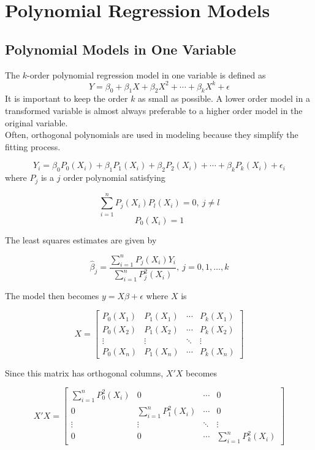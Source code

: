 \chapter{Polynomial Regression Models}

\section{Polynomial Models in One Variable}
The $k$-order polynomial regression model in one variable is defined as 
\[Y = \beta_0 + \beta_1X + \beta_2X^2 + \cdots + \beta_kX^k + \epsilon\]
It is important to keep the order $k$ as small as possible. A lower order model in a transformed variable is almost always preferable to a higher order model in the original variable.\\

\noindent
Often, orthogonal polynomials are used in modeling because they simplify the fitting process.

\[Y_i = \beta_0P_0(X_i) + \beta_1P_1(X_i) + \beta_2P_2(X_i) + \cdots + \beta_kP_k(X_i) + \epsilon_i\]
where $P_j$ is a $j$ order polynomial satisfying 

\[\sum_{i=1}^n P_j(X_i)P_l(X_i) = 0, \ j \neq l\]
\[P_0(X_i) = 1\]


\noindent
The least squares estimates are given by 

\[\hat{\beta}_j = \frac{\sum_{i=1}^n P_j(X_i)Y_i}{\sum_{i=1}^n P_j^2(X_i)}, \ j=0,1,\ldots,k\]

The model then becomes $y = X\beta + \epsilon$ where $X$ is 

\[X = \begin{bmatrix}
    P_0(X_1) & P_1(X_1) & \cdots & P_k(X_1)\\
    P_0(X_2) & P_1(X_2) & \cdots & P_k(X_2)\\
    \vdots & \vdots & \ddots & \vdots\\
    P_0(X_n) & P_1(X_n) & \cdots & P_k(X_n)
\end{bmatrix}\]

Since this matrix has orthogonal columns, $X'X$ becomes 

\[X'X = \begin{bmatrix}
    \sum\limits_{i=1}^n P_0^2(X_i) & 0 & \cdots & 0\\
    0 & \sum\limits_{i=1}^n P_1^2(X_i) & \cdots & 0\\
    \vdots & \vdots & \ddots & \vdots\\
    0 & 0 & \cdots & \sum\limits_{i=1}^n P_k^2(X_i)
\end{bmatrix}\]

